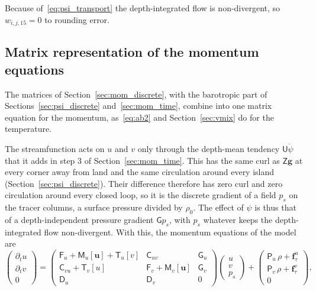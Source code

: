 \documentclass{article}
\begin{document}
Because of~\eqref{eq:psi_transport} the depth-integrated flow is non-divergent, so $w_{i,j,15} = 0$ to rounding error.

\subsection{Matrix representation of the momentum equations}\label{sec:mom_matrix}

The matrices of Section~\ref{sec:mom_discrete}, with the barotropic part of Sections~\ref{sec:psi_discrete} and~\ref{sec:mom_time}, combine into one matrix equation for the momentum, as~\eqref{eq:ab2} and Section~\ref{sec:vmix} do for the temperature.

The streamfunction acts on $u$ and $v$ only through the depth-mean tendency $\mathsf{U}\dot\psi$ that it adds in step 3 of Section~\ref{sec:mom_time}. This has the same curl as $\mathsf{Z}\mathbf{g}$ at every corner away from land and the same circulation around every island (Section~\ref{sec:psi_discrete}). Their difference therefore has zero curl and zero circulation around every closed loop, so it is the discrete gradient of a field $p_s$ on the tracer columns, a surface pressure divided by $\rho_0$. The effect of $\psi$ is thus that of a depth-independent pressure gradient $\mathsf{G}p_s$, with $p_s$ whatever keeps the depth-integrated flow non-divergent. With this, the momentum equations of the model are
\begin{equation}
\begin{pmatrix} \partial_t u \\ \partial_t v \\ 0 \end{pmatrix}
=
\begin{pmatrix}
\mathsf{F}_u + \mathsf{M}_u[\mathbf{u}] + \mathsf{T}_u[v] & \mathsf{C}_{uv} & \mathsf{G}_u \\
\mathsf{C}_{vu} + \mathsf{T}_v[u] & \mathsf{F}_v + \mathsf{M}_v[\mathbf{u}] & \mathsf{G}_v \\
\mathsf{D}_u & \mathsf{D}_v & 0
\end{pmatrix}
\begin{pmatrix} u \\ v \\ p_s \end{pmatrix}
+
\begin{pmatrix} \mathsf{P}_u\,\rho + \mathbf{f}^u_\tau \\ \mathsf{P}_v\,\rho + \mathbf{f}^v_\tau \\ 0 \end{pmatrix},
\label{eq:mom_full}
\end{equation}
\end{document}
